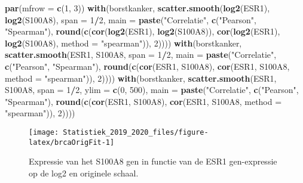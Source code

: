 \documentclass[12pt,dutch,coursenotes]{book}
\newenvironment{Shaded}{\begin{snugshade}}{\end{snugshade}}
\newcommand{\KeywordTok}[1]{\textcolor[rgb]{0.13,0.29,0.53}{\textbf{#1}}}
\newcommand{\DataTypeTok}[1]{\textcolor[rgb]{0.13,0.29,0.53}{#1}}
\newcommand{\DecValTok}[1]{\textcolor[rgb]{0.00,0.00,0.81}{#1}}
\newcommand{\StringTok}[1]{\textcolor[rgb]{0.31,0.60,0.02}{#1}}
\newcommand{\OperatorTok}[1]{\textcolor[rgb]{0.81,0.36,0.00}{\textbf{#1}}}
\newcommand{\NormalTok}[1]{#1}
\theoremstyle{definition}
\theoremstyle{definition}
\theoremstyle{definition}
\theoremstyle{remark}
\begin{document}
\begin{Shaded}
\begin{Highlighting}[]
\KeywordTok{par}\NormalTok{(}\DataTypeTok{mfrow =} \KeywordTok{c}\NormalTok{(}\DecValTok{1}\NormalTok{, }\DecValTok{3}\NormalTok{))}
\KeywordTok{with}\NormalTok{(borstkanker, }\KeywordTok{scatter.smooth}\NormalTok{(}\KeywordTok{log2}\NormalTok{(ESR1), }\KeywordTok{log2}\NormalTok{(S100A8), }
    \DataTypeTok{span =} \DecValTok{1}\OperatorTok{/}\DecValTok{2}\NormalTok{, }\DataTypeTok{main =} \KeywordTok{paste}\NormalTok{(}\StringTok{"Correlatie"}\NormalTok{, }\KeywordTok{c}\NormalTok{(}\StringTok{"Pearson"}\NormalTok{, }
        \StringTok{"Spearman"}\NormalTok{), }\KeywordTok{round}\NormalTok{(}\KeywordTok{c}\NormalTok{(}\KeywordTok{cor}\NormalTok{(}\KeywordTok{log2}\NormalTok{(ESR1), }\KeywordTok{log2}\NormalTok{(S100A8)), }
        \KeywordTok{cor}\NormalTok{(}\KeywordTok{log2}\NormalTok{(ESR1), }\KeywordTok{log2}\NormalTok{(S100A8), }\DataTypeTok{method =} \StringTok{"spearman"}\NormalTok{)), }
        \DecValTok{2}\NormalTok{))))}
\KeywordTok{with}\NormalTok{(borstkanker, }\KeywordTok{scatter.smooth}\NormalTok{(ESR1, S100A8, }\DataTypeTok{span =} \DecValTok{1}\OperatorTok{/}\DecValTok{2}\NormalTok{, }
    \DataTypeTok{main =} \KeywordTok{paste}\NormalTok{(}\StringTok{"Correlatie"}\NormalTok{, }\KeywordTok{c}\NormalTok{(}\StringTok{"Pearson"}\NormalTok{, }\StringTok{"Spearman"}\NormalTok{), }
        \KeywordTok{round}\NormalTok{(}\KeywordTok{c}\NormalTok{(}\KeywordTok{cor}\NormalTok{(ESR1, S100A8), }\KeywordTok{cor}\NormalTok{(ESR1, S100A8, }
            \DataTypeTok{method =} \StringTok{"spearman"}\NormalTok{)), }\DecValTok{2}\NormalTok{))))}
\KeywordTok{with}\NormalTok{(borstkanker, }\KeywordTok{scatter.smooth}\NormalTok{(ESR1, S100A8, }\DataTypeTok{span =} \DecValTok{1}\OperatorTok{/}\DecValTok{2}\NormalTok{, }
    \DataTypeTok{ylim =} \KeywordTok{c}\NormalTok{(}\DecValTok{0}\NormalTok{, }\DecValTok{500}\NormalTok{), }\DataTypeTok{main =} \KeywordTok{paste}\NormalTok{(}\StringTok{"Correlatie"}\NormalTok{, }\KeywordTok{c}\NormalTok{(}\StringTok{"Pearson"}\NormalTok{, }
        \StringTok{"Spearman"}\NormalTok{), }\KeywordTok{round}\NormalTok{(}\KeywordTok{c}\NormalTok{(}\KeywordTok{cor}\NormalTok{(ESR1, S100A8), }\KeywordTok{cor}\NormalTok{(ESR1, }
\NormalTok{        S100A8, }\DataTypeTok{method =} \StringTok{"spearman"}\NormalTok{)), }\DecValTok{2}\NormalTok{))))}
\end{Highlighting}
\end{Shaded}

\begin{figure}

{\centering \texttt{[image: Statistiek\_2019\_2020\_files/figure-latex/brcaOrigFit-1]} 

}

\caption{Expressie van het S100A8 gen in functie van de ESR1 gen-expressie op de log2 en originele schaal.}\label{fig:brcaOrigFit}
\end{figure}
\end{document}
